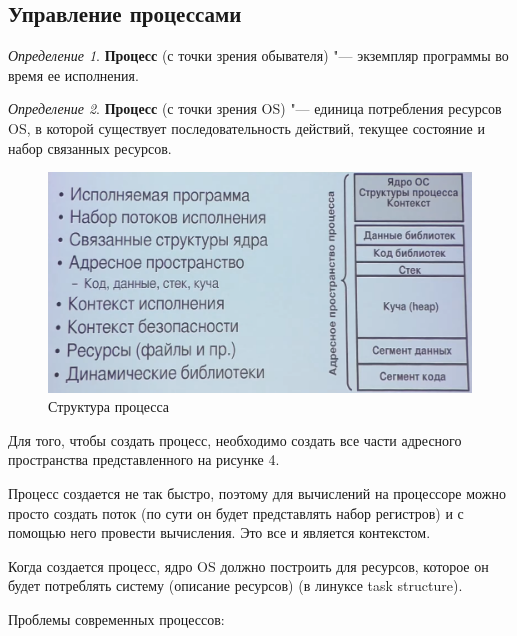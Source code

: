 \documentclass[bachelor, och, pract]{SCWorks}
\theoremstyle{remark}
\newtheorem{definition}{Определение}
\begin{document}
    \subsection{Управление процессами}

    \begin{definition}
        \textbf{Процесс} (с точки зрения обывателя) "--- экземпляр программы во время ее исполнения.
    \end{definition}
    
    \begin{definition}
        \textbf{Процесс} (с точки зрения OS) "--- единица потребления ресурсов OS, в которой существует последовательность действий, текущее состояние и набор связанных ресурсов.
    \end{definition}
    
    \begin{figure}[H]
        \begin{center}
            \includegraphics[scale=0.4]{res/process-structure.png}
            \caption{Структура процесса}
        \end{center}
    \end{figure}

    Для того, чтобы создать процесс, необходимо создать все части адресного пространства представленного на рисунке 4.

    Процесс создается не так быстро, поэтому для вычислений на процессоре можно просто создать поток (по сути он будет представлять набор регистров) и с помощью него провести вычисления. Это все и является контекстом.

    Когда создается процесс, ядро OS должно построить для ресурсов, которое он будет потреблять систему (описание ресурсов) (в линуксе task structure). 

    Проблемы современных процессов:
\end{document}
